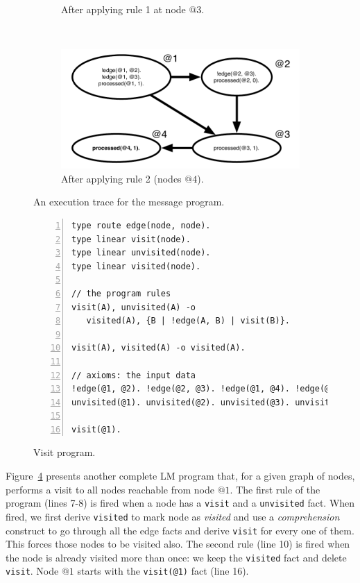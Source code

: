 \begin{figure}[h]
\begin{subfigure}[b]{0.5\textwidth}
                \caption{After applying rule 1 at node $@3$.}
                \label{fig:message_trace3}
        \end{subfigure}%
        ~
        \begin{subfigure}[b]{0.5\textwidth}
                  \includegraphics[width=\textwidth]{message_trace4}
                  \caption{After applying rule 2 (nodes $@4$).}
                  \label{fig:message_trace4}
          \end{subfigure}
        \caption{An execution trace for the message program.}\label{fig:message_trace}
\end{figure}

\begin{figure}[h!]
\small\begin{Verbatim}[numbers=left]
type route edge(node, node).
type linear visit(node).
type linear unvisited(node).
type linear visited(node).

// the program rules
visit(A), unvisited(A) -o
   visited(A), {B | !edge(A, B) | visit(B)}.

visit(A), visited(A) -o visited(A).

// axioms: the input data
!edge(@1, @2). !edge(@2, @3). !edge(@1, @4). !edge(@2, @4).
unvisited(@1). unvisited(@2). unvisited(@3). unvisited(@4).

visit(@1).
\end{Verbatim}
  \caption{Visit program.}
  \label{code:visit}
\end{figure}
\normalsize

Figure~\ref{code:visit} presents another complete LM program that, for a given graph
of nodes, performs a visit to all nodes reachable from node $@1$.
The first rule of the program (lines 7-8) is fired when a node has a \texttt{visit} and a \texttt{unvisited} fact. When fired, we first derive \texttt{visited} to mark node as \textit{visited} and use a
\emph{comprehension} construct to go through all the edge facts and derive \texttt{visit} for every
one of them. This forces those nodes to be visited also. The second rule (line 10) is fired when the
node is already visited more than once: we keep the \texttt{visited} fact and delete \texttt{visit}.
Node $@1$ starts with the \texttt{visit(@1)} fact (line 16).

